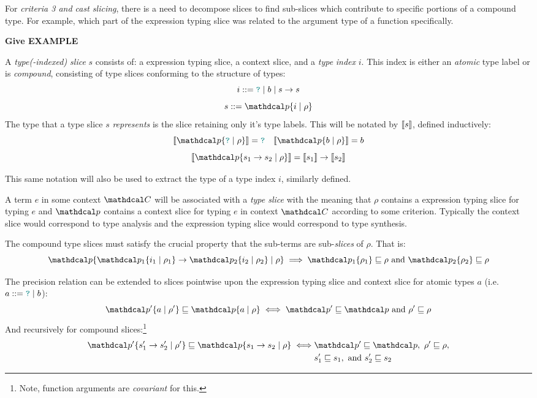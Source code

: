 For \textit{criteria 3 and cast slicing}, there is a need to decompose slices to find sub-slices which contribute to specific portions of a compound type. For example, which part of the expression typing slice was related to the argument type of a function specifically.

\textbf{Give EXAMPLE}

A \textit{type(-indexed) slice} $s$ consists of: a expression typing slice, a context slice, and a \textit{type} \textit{index} $i$. This index is either an \textit{atomic} type label or is \textit{compound}, consisting of type slices conforming to the structure of types:
\[i ::= {\color{teal}\texttt{?}} \mid b \mid s \to s\]
\[s ::= \p\{i \mid \rho\}\]
The type that a type slice $s$ \textit{represents} is the slice retaining only it's type labels. This will be notated by $\llbracket s \rrbracket$, defined inductively:
\[\type{\p\{\dyn\mid \rho\}} = \dyn \quad \type{\p\{b \mid \rho\}} = b\]
\[\type{\p\{s_1 \to s_2 \mid \rho\}} = \type{s_1} \to \type{s_2}\]

This same notation will also be used to extract the type of a type index $i$, similarly defined.

A term $e$ in some context $\C$ will be associated with a \textit{type slice} with the meaning that $\rho$ contains a expression typing slice for typing $e$ and $\p$ contains a context slice for typing $e$ in context $\C$ according to some criterion. Typically the context slice would correspond to type analysis and the expression typing slice would correspond to type synthesis.

The compound type slices must satisfy the crucial property that the sub-terms are sub-\textit{slices} of $\rho$. That is:
\[\p\{\p_1\{i_1 \mid \rho_1\} \to \p_2\{i_2 \mid \rho_2\} \mid \rho\} \implies \p_1\{\rho_1\} \sqsubseteq \rho\text{ and }\p_2\{\rho_2\} \sqsubseteq \rho\]

The precision relation can be extended to slices pointwise upon the expression typing slice and context slice for atomic types $a$ (i.e. $a ::= {\color{teal}\texttt{?}} \mid b$):
\[\p'\{a \mid \rho'\} \sqsubseteq \p\{a \mid \rho\} \iff \p' \sqsubseteq \p\text{ and } \rho' \sqsubseteq \rho\]
And recursively for compound slices:\footnote{Note, function arguments are \textit{covariant} for this.}
\begin{align*}
\p'\{s_1' \to s_2' \mid \rho'\} \sqsubseteq \p\{s_1 \to s_2 \mid \rho\} \iff &\p' \sqsubseteq \p,\ \rho' \sqsubseteq \rho,\\
&s_1' \sqsubseteq s_1,\text{ and }s_2' \sqsubseteq s_2
\end{align*}

